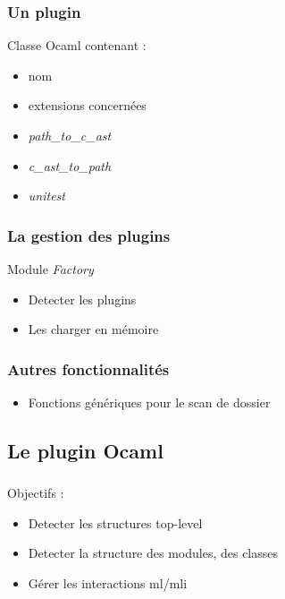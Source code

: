 \documentclass{beamer}
\begin{document}
\begin{frame}
    \frametitle{Un plugin}

    Classe Ocaml contenant :
    \begin{itemize}
        \item nom
        \item extensions concernées
        \item \textit{path\_to\_c\_ast}
        \item \textit{c\_ast\_to\_path}
        \item \textit{unitest}
    \end{itemize}
\end{frame}

\begin{frame}
    \frametitle{La gestion des plugins}

    Module \textit{Factory}
    \begin{itemize}
        \item Detecter les plugins
        \item Les charger en mémoire
    \end{itemize}
\end{frame}

\begin{frame}
    \frametitle{Autres fonctionnalités}

    \begin{itemize}
        \item Fonctions génériques pour le scan de dossier
    \end{itemize}
\end{frame}







\begin{frame}
    \section{Le plugin Ocaml}
    \frametitle{}

 Objectifs :
 \begin{itemize}
    \item Detecter les structures top-level
    \item Detecter la structure des modules, des classes
    \item Gérer les interactions ml/mli
 \end{itemize}

\end{frame}
\end{document}
